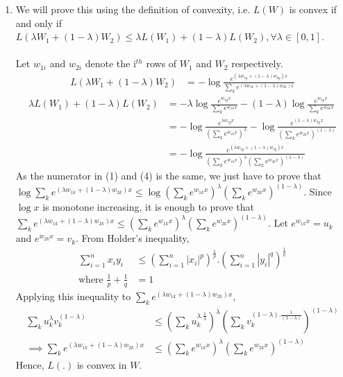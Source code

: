 \documentclass[11pt,english]{article}
\begin{document}
\begin{enumerate}
	\item We will prove this using the definition of convexity, i.e. $L(W)$ is convex if and only if $L(\lambda W_1 + (1 - \lambda)W_2) \leq \lambda L(W_1) + (1 - \lambda) L(W_2), \forall \lambda \in [0,1]$. \\\\
	Let $w_{1i}$ and $w_{2i}$ denote the $\text{i}^{th}$ rows of $W_1$ and $W_2$ respectively.
	\begin{align}
	L(\lambda W_1 + (1 - \lambda)W_2) &= -\log \frac{e^{(\lambda w_{1y} + (1 - \lambda)w_{2y})x}}{\sum_k e^{(\lambda w_{1k} + (1 - \lambda)w_{2k})x}}
	\end{align}
	\begin{align}
	\lambda L(W_1) + (1 - \lambda) L(W_2) &= -\lambda\log\frac{e^{w_{1y}x}}{\sum_k e^{w_{1k}x}} - (1 - \lambda)\log\frac{e^{w_{2y}x}}{\sum_k e^{w_{2k}x}} \\
	&= -\log\frac{e^{\lambda w_{1y}x}}{(\sum_k e^{w_{1k}x})^{\lambda}} - \log\frac{e^{(1 - \lambda)w_{2y}x}}{(\sum_k e^{w_{2k}x})^{(1 - \lambda)}} \\
	&= -\log \frac{e^{(\lambda w_{1y} + (1 - \lambda)w_{2y})x}}{(\sum_k e^{w_{1k}x})^{\lambda}(\sum_k e^{w_{2k}x})^{(1 - \lambda)}}
	\end{align}
	As the numerator in (1) and (4) is the same, we just have to prove that $\log \sum_k e^{(\lambda w_{1k} + (1 - \lambda)w_{2k})x} \leq \log (\sum_k e^{w_{1k}x})^{\lambda}(\sum_k e^{w_{2k}x})^{(1 - \lambda)}$. Since $\log x$ is monotone increasing, it is enough to prove that $\sum_k e^{(\lambda w_{1k} + (1 - \lambda)w_{2k})x} \leq (\sum_k e^{w_{1k}x})^{\lambda}(\sum_k e^{w_{2k}x})^{(1 - \lambda)}$. Let $e^{w_{1k}x} = u_k$ and $e^{w_{2k}x} = v_k$. From Holder's inequality,
	\begin{align}
	\sum_{i=1}^n x_i y_i &\leq \left(\sum_{i=1}^n|x_i|^p\right)^{\frac{1}{p}} . \left(\sum_{i=1}^n|y_i|^q\right)^{\frac{1}{q}} \\
	\text{where } \frac{1}{p} + \frac{1}{q} &= 1
	\end{align}
	Applying this inequality to $\sum_k e^{(\lambda w_{1k} + (1 - \lambda)w_{2k})x}$,
	\begin{align}
	\sum_k u_k^\lambda v_k^{(1 - \lambda)} &\leq \left(\sum_k u_k^{\lambda . \frac{1}{\lambda}}\right)^\lambda \left(\sum_k v_k^{(1 - \lambda) . \frac{1}{(1 - \lambda)}}\right)^{(1 - \lambda)} \\
	\implies \sum_k e^{(\lambda w_{1k} + (1 - \lambda)w_{2k})x} &\leq (\sum_k e^{w_{1k}x})^{\lambda}(\sum_k e^{w_{2k}x})^{(1 - \lambda)}
	\end{align}
	Hence, $L(.)$ is convex in $W$.
	
\end{enumerate}
\end{document}
